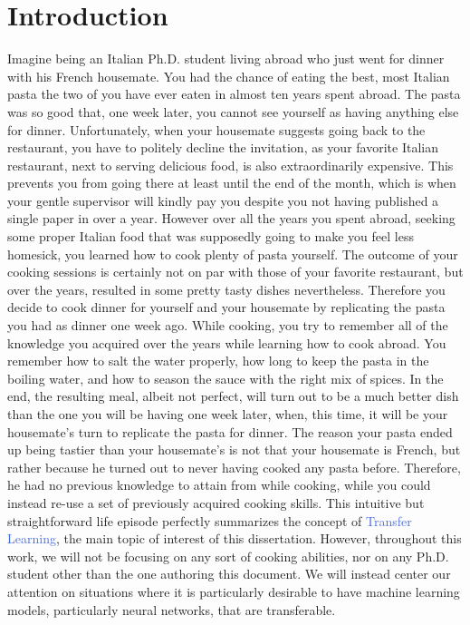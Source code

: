 \section{Introduction}
\label{sec:tl_introduction}
Imagine being an Italian Ph.D. student living abroad who just went for dinner with his French housemate. You had the chance of eating the best, most Italian pasta the two of you have ever eaten in almost ten years spent abroad. The pasta was so good that, one week later, you cannot see yourself as having anything else for dinner. Unfortunately, when your housemate suggests going back to the restaurant, you have to politely decline the invitation, as your favorite Italian restaurant, next to serving delicious food, is also extraordinarily expensive. This prevents you from going there at least until the end of the month, which is when your gentle supervisor will kindly pay you despite you not having published a single paper in over a year. However over all the years you spent abroad, seeking some proper Italian food that was supposedly going to make you feel less homesick, you learned how to cook plenty of pasta yourself. The outcome of your cooking sessions is certainly not on par with those of your favorite restaurant, but over the years, resulted in some pretty tasty dishes nevertheless. Therefore you decide to cook dinner for yourself and your housemate by replicating the pasta you had as dinner one week ago. While cooking, you try to remember all of the knowledge you acquired over the years while learning how to cook abroad. You remember how to salt the water properly, how long to keep the pasta in the boiling water, and how to season the sauce with the right mix of spices. In the end, the resulting meal, albeit not perfect, will turn out to be a much better dish than the one you will be having one week later, when, this time, it will be your housemate's turn to replicate the pasta for dinner. The reason your pasta ended up being tastier than your housemate's is not that your housemate is French, but rather because he turned out to never having cooked any pasta before. Therefore, he had no previous knowledge to attain from while cooking, while you could instead re-use a set of previously acquired cooking skills. This intuitive but straightforward life episode perfectly summarizes the concept of \textcolor{RoyalBlue}{Transfer Learning}, the main topic of interest of this dissertation. However, throughout this work, we will not be focusing on any sort of cooking abilities, nor on any Ph.D. student other than the one authoring this document. We will instead center our attention on situations where it is particularly desirable to have machine learning models, particularly neural networks, that are transferable. 


